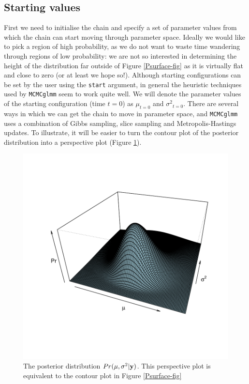 \documentclass{article}
\begin{document}
\subsection{Starting values}

First we need to initialise the chain and specify a set of parameter values from which the chain can start moving through parameter space. Ideally we would like to pick a region of high probability, as we do not want to waste time wandering through regions of low probability: we are not so interested in determining the height of the distribution far outside of  Figure \ref{Psurface-fig} as it is virtually flat and close to zero (or at least we hope so!).  Although starting configurations can be set by the user using the \texttt{start} argument, in general the heuristic techniques used by \texttt{MCMCglmm} seem to work quite well. We will denote the parameter values of the starting configuration (time $t=0$) as $\mu_{t=0}$ and ${\sigma^{2}}_{t=0}$. There are several ways in which we can get the chain to move in parameter space, and \texttt{MCMCglmm} uses a combination of Gibbs sampling, slice sampling and Metropolis-Hastings updates. To illustrate, it will be easier to turn the contour plot of the posterior distribution into a perspective plot (Figure \ref{Psurface.persp-fig}).

  

\begin{figure}[!h]
\begin{center}
\includegraphics{Lecture1-052}
\end{center}
\caption{The posterior distribution $Pr(\mu, \sigma^{2} | {\bf y})$. This perspective plot is equivalent to the contour plot in Figure \ref{Psurface-fig}}
\label{Psurface.persp-fig}
\end{figure}
\end{document}
